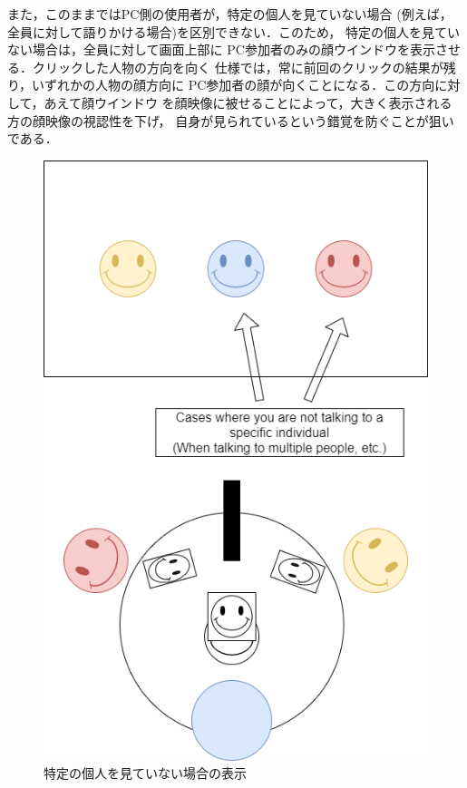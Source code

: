 また，このままではPC側の使用者が，特定の個人を見ていない場合
(例えば，全員に対して語りかける場合)を区別できない．このため，
特定の個人を見ていない場合は，全員に対して画面上部に
PC参加者のみの顔ウインドウを表示させる．クリックした人物の方向を向く
仕様では，常に前回のクリックの結果が残り，いずれかの人物の顔方向に
PC参加者の顔が向くことになる．この方向に対して，あえて顔ウインドウ
を顔映像に被せることによって，大きく表示される方の顔映像の視認性を下げ，
自身が見られているという錯覚を防ぐことが狙いである．

\begin{figure}[tp]
  \centering
  \includegraphics[scale=0.6]{fig/SPcase.png}
  \caption{特定の個人を見ていない場合の表示}
\end{figure}